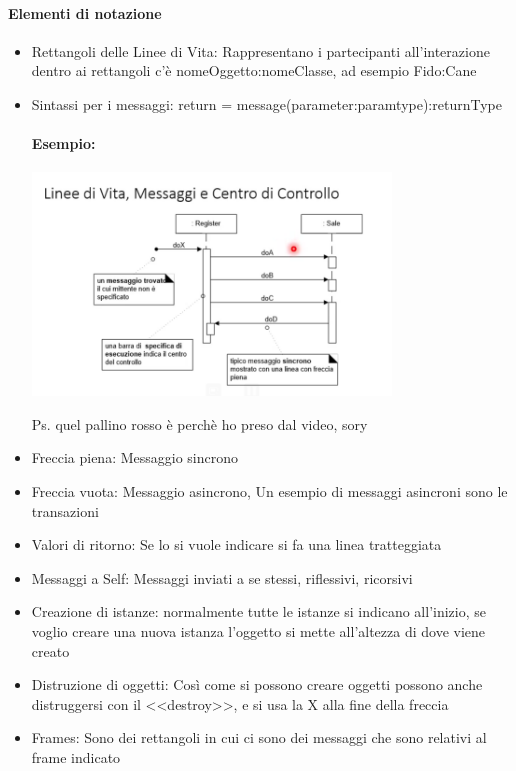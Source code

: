 \documentclass[12pt, a4paper, openany, twoside]{book}
\begin{document}
\paragraph{Elementi di notazione}
\begin{itemize}
	\item Rettangoli delle Linee di Vita: Rappresentano i partecipanti all'interazione
	dentro ai rettangoli c'è nomeOggetto:nomeClasse, ad esempio Fido:Cane
	\item Sintassi per i messaggi: return = message(parameter:paramtype):returnType
	\paragraph{Esempio:}
	\begin{center}
	\includegraphics[width=0.75\textwidth]{12}
	\end{center}
	Ps. quel pallino rosso è perchè ho preso dal video, sory
	\item Freccia piena: Messaggio sincrono 
	\item Freccia vuota: Messaggio asincrono, Un esempio di messaggi asincroni
	sono le transazioni
	\item Valori di ritorno: Se lo si vuole indicare si fa una linea tratteggiata
	\item Messaggi a Self: Messaggi inviati a se stessi, riflessivi, ricorsivi
	\item Creazione di istanze: normalmente tutte le istanze si indicano all'inizio,
	se voglio creare una nuova istanza l'oggetto si mette all'altezza di dove viene
	creato
	\item Distruzione di oggetti: Così come si possono creare oggetti possono anche
	distruggersi con il <<destroy>>, e si usa la X alla fine della freccia
	\item Frames: Sono dei rettangoli in cui ci sono dei messaggi che sono relativi
	al frame indicato

\end{itemize}
\end{document}
